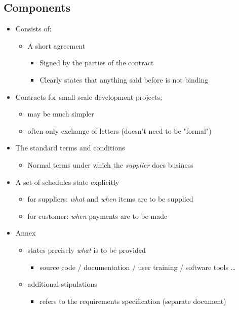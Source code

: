 \documentclass{article}
\begin{document}
\subsection{Components}
\begin{itemize}
\item Consists of:
\begin{itemize}
\item A short agreement
\begin{itemize}
\item Signed by the parties of the contract
\item Clearly states that anything said before is not binding
\end{itemize}
\end{itemize}
\item Contracts for small-scale development projects:
\begin{itemize}
\item may be much simpler
\item often only exchange of letters (doesn't need to be "formal")
\end{itemize}
\item The standard terms and conditions
\begin{itemize}
\item Normal terms under which the \emph{supplier} does business
\end{itemize}
\item A set of schedules state explicitly
\begin{itemize}
\item for suppliers: \emph{what} and \emph{when} items are to be supplied
\item for customer: \emph{when} payments are to be made
\end{itemize}
\item Annex
\begin{itemize}
\item states precisely \emph{what} is to be provided
\begin{itemize}
\item source code / documentation / user training / software tools \ldots
\end{itemize}
\item additional stipulations 
\begin{itemize}
\item refers to the requirements specification (separate document)
\end{itemize}
\end{itemize}
\end{itemize}
\end{document}
